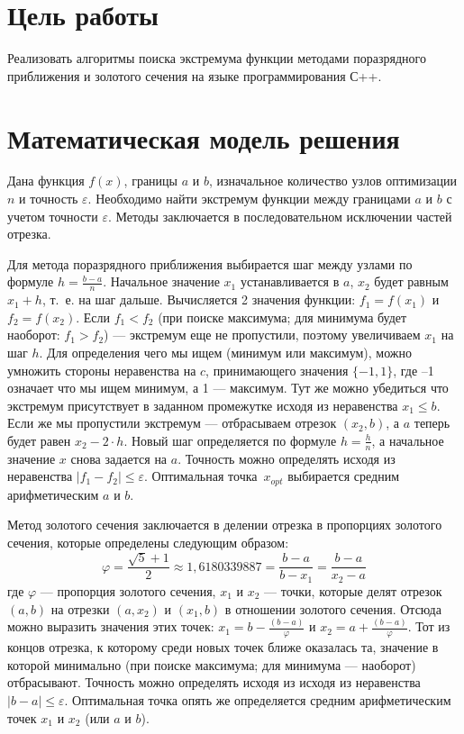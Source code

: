 \documentclass[a4paper]{article}
\begin{document}

\setcounter{page}{2}  %
\fontsize{14pt}{18pt}\selectfont

\section{Цель работы}
Реализовать алгоритмы поиска экстремума функции методами поразрядного
приближения и золотого сечения на языке программирования С++.

\section{Математическая модель решения}
Дана функция $f(x)$, границы $a$ и $b$, изначальное количество узлов оптимизации
$n$ и точность $\varepsilon$.
Необходимо найти экстремум функции между границами $a$ и $b$
с учетом точности $\varepsilon$.
Методы заключается в последовательном исключении частей отрезка.

Для метода поразрядного приближения выбирается шаг между узлами по формуле
$h=\frac{b-a}{n}$.
Начальное значение $x_1$ устанавливается в $a$, $x_2$ будет равным $x_1+h$,
т.~е. на шаг дальше.
Вычисляется 2 значения функции: $f_1=f(x_1)$ и $f_2=f(x_2)$.
Если $f_1<f_2$ (при поиске максимума; для минимума будет наоборот: $f_1>f_2$)
--- экстремум еще не пропустили, поэтому увеличиваем $x_1$ на шаг $h$.
Для определения чего мы ищем (минимум или максимум), можно умножить стороны
неравенства на $c$, принимающего значения $\{-1,1\}$, где --1 означает что мы
ищем минимум, а 1 --- максимум.
Тут же можно убедиться что экстремум присутствует в заданном
промежутке исходя из неравенства $x_1\le b$.
Если же мы пропустили экстремум --- отбрасываем отрезок $(x_2,b)$,
а $a$ теперь будет равен $x_2-2\cdot h$.
Новый шаг определяется по формуле $h=\frac{h}{n}$, а начальное значение $x$
снова задается на $a$.
Точность можно определять исходя из неравенства $|f_1-f_2|\le \varepsilon$.
Оптимальная точка~$x_{opt}$ выбирается средним арифметическим $a$ и $b$.

Метод золотого сечения заключается в делении отрезка в пропорциях
золотого сечения, которые определены следующим образом:
$$
\varphi=
\frac{\sqrt{5}+1}{2}\approx
1{,}6180339887=
\frac{b-a}{b-x_1}=
\frac{b-a}{x_2-a}
$$
где $\varphi$ --- пропорция золотого сечения,
$x_1$ и $x_2$ --- точки, которые делят отрезок $(a,b)$
на отрезки $(a,x_2)$ и $(x_1,b)$ в отношении золотого сечения.
Отсюда можно выразить значения этих точек: 
$x_1=b-\frac{(b-a)}{\varphi}$ и $x_2=a+\frac{(b-a)}{\varphi}$.
Тот из концов отрезка, к которому среди новых точек ближе оказалась та,
значение в которой минимально (при поиске максимума; для минимума ---
наоборот) отбрасывают.
Точность можно определять исходя из исходя из неравенства $|b-a|\le\varepsilon$.
Оптимальная точка опять же определяется средним арифметическим
точек $x_1$ и $x_2$ (или $a$ и $b$).
\end{document}
